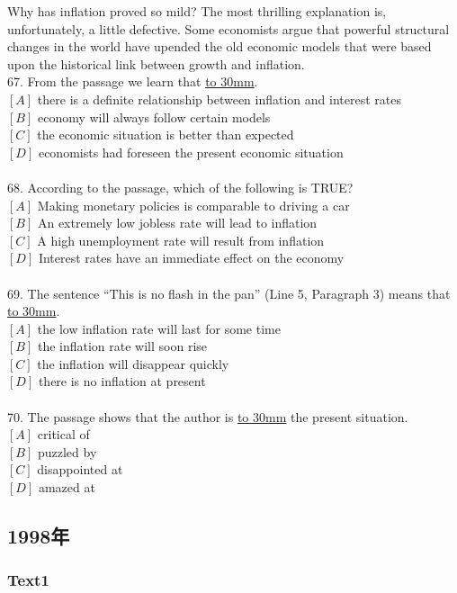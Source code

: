 \documentclass[a4paper]{article}
\begin{document}
\par
Why has inflation proved so mild? The most thrilling explanation is, unfortunately, a little defective. Some economists argue that powerful structural changes in the world have upended the old economic models that were based upon the historical link between growth and inflation.
\\67.	From the passage we learn that \underline{\hbox to 30mm{}}.\\$[A]$ there is a definite relationship between inflation and interest rates\\$[B]$ economy will always follow certain models\\$[C]$ the economic situation is better than expected\\$[D]$ economists had foreseen the present economic situation\\\\68.	According to the passage, which of the following is TRUE?\\$[A]$ Making monetary policies is comparable to driving a car\\$[B]$ An extremely low jobless rate will lead to inflation\\$[C]$ A high unemployment rate will result from inflation\\$[D]$ Interest rates have an immediate effect on the economy\\\\69.	The sentence “This is no flash in the pan” (Line 5, Paragraph 3) means that \underline{\hbox to 30mm{}}.\\$[A]$ the low inflation rate will last for some time\\$[B]$ the inflation rate will soon rise\\$[C]$ the inflation will disappear quickly\\$[D]$ there is no inflation at present\\\\70.	The passage shows that the author is \underline{\hbox to 30mm{}} the present situation.\\$[A]$ critical of\\$[B]$ puzzled by\\$[C]$ disappointed at\\$[D]$ amazed at\\\subsection{1998年}
\subsubsection{Text1}
\end{document}
